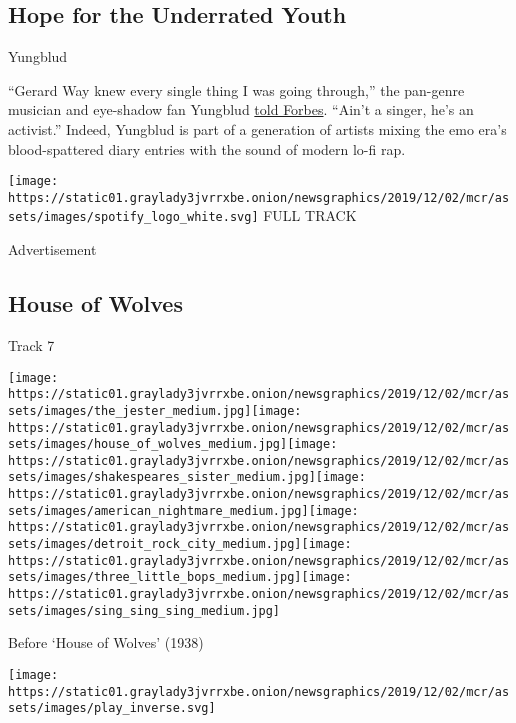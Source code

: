 \hypertarget{hope-for-the-underrated-youth}{%
\subsection{Hope for the Underrated
Youth}\label{hope-for-the-underrated-youth}}

Yungblud

``Gerard Way knew every single thing I was going through,'' the
pan-genre musician and eye-shadow fan Yungblud
\href{https://www.forbes.com/sites/stevebaltin/2019/10/29/yungblud-on-the-constant-fire-and-optimism-in-todays-youth/}{told
Forbes}. ``Ain't a singer, he's an activist.'' Indeed, Yungblud is part
of a generation of artists mixing the emo era's blood-spattered diary
entries with the sound of modern lo-fi rap.

\href{https://open.spotify.com/track/24qhW8fqWyrMHqkBfM2HPk?si=yBsqQYguTMyt78h6nptwEQ}{}

\texttt{[image: https://static01.graylady3jvrrxbe.onion/newsgraphics/2019/12/02/mcr/assets/images/spotify\_logo\_white.svg]}
FULL TRACK

Advertisement

\hypertarget{house-of-wolves}{%
\subsection{House of Wolves}\label{house-of-wolves}}

Track 7

\texttt{[image: https://static01.graylady3jvrrxbe.onion/newsgraphics/2019/12/02/mcr/assets/images/the\_jester\_medium.jpg]}\texttt{[image: https://static01.graylady3jvrrxbe.onion/newsgraphics/2019/12/02/mcr/assets/images/house\_of\_wolves\_medium.jpg]}\texttt{[image: https://static01.graylady3jvrrxbe.onion/newsgraphics/2019/12/02/mcr/assets/images/shakespeares\_sister\_medium.jpg]}\texttt{[image: https://static01.graylady3jvrrxbe.onion/newsgraphics/2019/12/02/mcr/assets/images/american\_nightmare\_medium.jpg]}\texttt{[image: https://static01.graylady3jvrrxbe.onion/newsgraphics/2019/12/02/mcr/assets/images/detroit\_rock\_city\_medium.jpg]}\texttt{[image: https://static01.graylady3jvrrxbe.onion/newsgraphics/2019/12/02/mcr/assets/images/three\_little\_bops\_medium.jpg]}\texttt{[image: https://static01.graylady3jvrrxbe.onion/newsgraphics/2019/12/02/mcr/assets/images/sing\_sing\_sing\_medium.jpg]}

Before `House of Wolves' (1938)

\texttt{[image: https://static01.graylady3jvrrxbe.onion/newsgraphics/2019/12/02/mcr/assets/images/play\_inverse.svg]}

